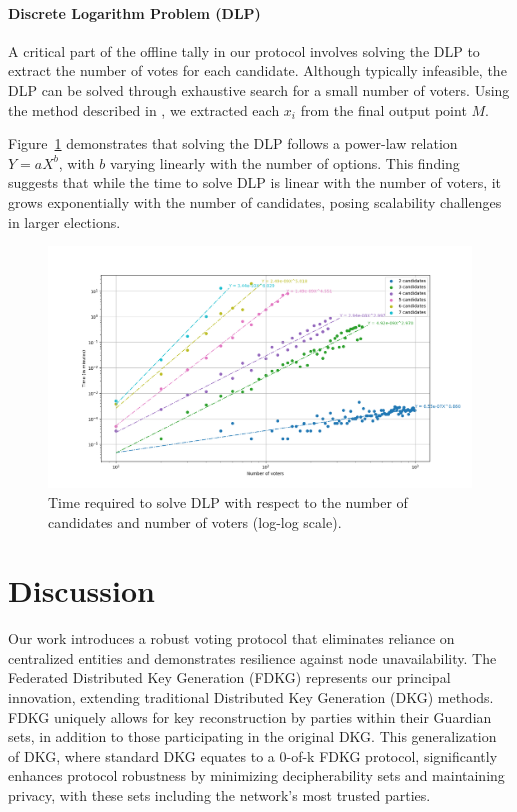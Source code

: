 \documentclass[runningheads]{llncs}
\begin{document}
\paragraph{Discrete Logarithm Problem (DLP)}

A critical part of the offline tally in our protocol involves solving the DLP to extract the number of votes for each candidate. Although typically infeasible, the DLP can be solved through exhaustive search for a small number of voters. Using the method described in \cite{haoAnonymousVotingTworound2010}, we extracted each $x_i$ from the final output point $M$. 

Figure~\ref{fig:dlog-search} demonstrates that solving the DLP follows a power-law relation \( Y = aX^b \), with \( b \) varying linearly with the number of options. This finding suggests that while the time to solve DLP is linear with the number of voters, it grows exponentially with the number of candidates, posing scalability challenges in larger elections.

\begin{figure}[H]
    \centering
    \includegraphics[width=\textwidth]{dlog-search-time.png}
    \caption{Time required to solve DLP with respect to the number of candidates and number of voters (log-log scale).}
    \label{fig:dlog-search}
\end{figure}


\section{Discussion}

Our work introduces a robust voting protocol that eliminates reliance on centralized entities and demonstrates resilience against node unavailability. The Federated Distributed Key Generation (FDKG) represents our principal innovation, extending traditional Distributed Key Generation (DKG) methods. FDKG uniquely allows for key reconstruction by parties within their Guardian sets, in addition to those participating in the original DKG. This generalization of DKG, where standard DKG equates to a 0-of-k FDKG protocol, significantly enhances protocol robustness by minimizing decipherability sets and maintaining privacy, with these sets including the network's most trusted parties.
\end{document}

